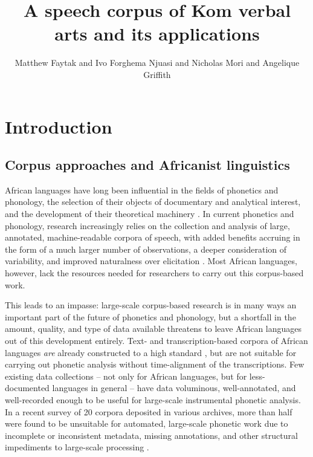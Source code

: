 \documentclass[output=paper,colorlinks,citecolor=brown
]{langscibook}
\author{Matthew Faytak\affiliation{University at Buffalo} and Ivo Forghema Njuasi\affiliation{University of Buea} and Nicholas Mori\affiliation{University at Buffalo} and Angelique Griffith\affiliation{University at Buffalo}}
\title{A speech corpus of Kom verbal arts and its applications}
\begin{document}
\maketitle

\section{Introduction}

\subsection{Corpus approaches and Africanist linguistics}


African languages have long been influential in the fields of phonetics and phonology, the selection of their objects of documentary and analytical interest, and the development of their theoretical machinery \citep{ladefoged-african, goldsmith1976autosegmental,  olson1999phonetic, casali2008atr, lionnet2018current}. 
In current phonetics and phonology, research increasingly relies on the collection and analysis of large, annotated, machine-readable corpora of speech,
with added benefits accruing in the form of a much larger number of observations, a deeper consideration of  variability, and improved naturalness over elicitation \citep{liberman2019corpus}. 
Most African languages, however, lack the resources needed for researchers to carry out this corpus-based work.   

This leads to an impasse: large-scale corpus-based research is in many ways an important part of the future of phonetics and phonology, but a shortfall in the amount, quality, and type of data available threatens to leave African languages out of this development entirely. 
Text- and transcription-based corpora of African languages \textit{are} already constructed to a high standard \citep[e.g.][]{prinsloo, deschryver}, but are not suitable for carrying out phonetic analysis without time-alignment of the transcriptions.
Few existing data collections -- not only for African languages, but for less-documented languages in general -- have data voluminous, well-annotated, and well-recorded enough to be useful for large-scale instrumental phonetic analysis. 
In a recent survey of 20 corpora deposited in various archives, more than half were found to be unsuitable for automated, large-scale phonetic work due to incomplete or inconsistent metadata, missing annotations, and other structural impediments to large-scale processing \citep{babinski2022usable, yi2022accessibility}. 
\end{document}
